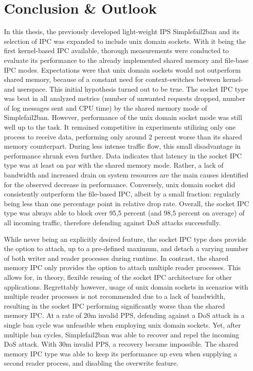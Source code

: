 %
%

\chapter{Conclusion \& Outlook}
In this thesis, the previously developed light-weight \ac{IPS} Simplefail2ban and its selection of \ac{IPC} was expanded to include unix domain sockets.
With it being the first kernel-based \ac{IPC} available, thorough measurements were conducted to evaluate its performance to the already implemented shared memory and file-base \ac{IPC} modes.
Expectations were that unix domain sockets would not outperform shared memory, because of a constant need for context-switches between kernel- and userspace.
This initial hypothesis turned out to be true.
The socket \ac{IPC} type was beat in all analyzed metrics (number of unwanted requests dropped, number of log messages sent and \ac{CPU} time) by the shared memory mode of Simplefail2ban.
However, performance of the unix domain socket mode was still well up to the task.
It remained competitive in experiments utilizing only one process to receive data, performing only around 2 percent worse than its shared memory counterpart.
During less intense traffic flow, this small disadvantage in performance shrunk even further.
Data indicates that latency in the socket \ac{IPC} type was at least on par with the shared memory mode.
Rather, a lack of bandwidth and increased drain on system resources are the main causes identified for the observed decrease in performance.
Conversely, unix domain socket did consistently outperform the file-based \ac{IPC}, albeit by a small fraction: regularly being less than one percentage point in relative drop rate.
Overall, the socket \ac{IPC} type was always able to block over 95,5 percent (and 98,5 percent on average) of all incoming traffic, therefore defending against \ac{DoS} attacks successfully.

While never being an explicitly desired feature, the socket \ac{IPC} type does provide the option to attach, up to a pre-defined maximum, and detach a varying number of both writer and reader processes during runtime.
In contrast, the shared memory \ac{IPC} only provides the option to attach multiple reader processes.
This allows for, in theory, flexible reusing of the socket \ac{IPC} architecture for other applications.
Regrettably however, usage of unix domain sockets in scenarios with multiple reader processes is not recommended due to a lack of bandwidth, resulting in the socket \ac{IPC} performing significantly worse than the shared memory \ac{IPC}.
At a rate of 20m invalid \ac{PPS}, defending against a \ac{DoS} attack in a single ban cycle was unfeasible when employing unix domain sockets.
Yet, after multiple ban cycles, Simplefail2ban was able to recover and repel the incoming \ac{DoS} attack.
With 30m invalid \ac{PPS}, a recovery became impossible.
The shared memory \ac{IPC} type was able to keep its performance up even when supplying a second reader process, and disabling the overwrite feature.

